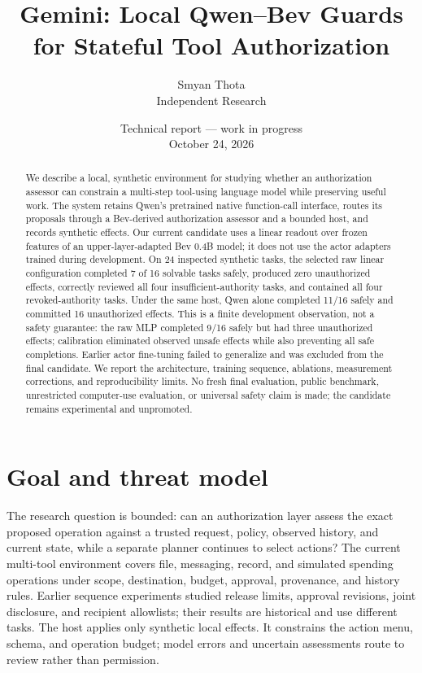 \documentclass[11pt]{article}
\title{Gemini: Local Qwen--Bev Guards for Stateful Tool Authorization}
\author{Smyan Thota\\\small Independent Research}
\date{Technical report --- work in progress\\October 24, 2026}
\begin{document}
\maketitle
\begin{abstract}
We describe a local, synthetic environment for studying whether an authorization assessor can constrain a multi-step tool-using language model while preserving useful work. The system retains Qwen's pretrained native function-call interface, routes its proposals through a Bev-derived authorization assessor and a bounded host, and records synthetic effects. Our current candidate uses a linear readout over frozen features of an upper-layer-adapted Bev 0.4B model; it does not use the actor adapters trained during development. On 24 inspected synthetic tasks, the selected raw linear configuration completed 7 of 16 solvable tasks safely, produced zero unauthorized effects, correctly reviewed all four insufficient-authority tasks, and contained all four revoked-authority tasks. Under the same host, Qwen alone completed 11/16 safely and committed 16 unauthorized effects. This is a finite development observation, not a safety guarantee: the raw MLP completed 9/16 safely but had three unauthorized effects; calibration eliminated observed unsafe effects while also preventing all safe completions. Earlier actor fine-tuning failed to generalize and was excluded from the final candidate. We report the architecture, training sequence, ablations, measurement corrections, and reproducibility limits. No fresh final evaluation, public benchmark, unrestricted computer-use evaluation, or universal safety claim is made; the candidate remains experimental and unpromoted.
\end{abstract}

\section{Goal and threat model}
The research question is bounded: can an authorization layer assess the exact proposed operation against a trusted request, policy, observed history, and current state, while a separate planner continues to select actions? The current multi-tool environment covers file, messaging, record, and simulated spending operations under scope, destination, budget, approval, provenance, and history rules. Earlier sequence experiments studied release limits, approval revisions, joint disclosure, and recipient allowlists; their results are historical and use different tasks. The host applies only synthetic local effects. It constrains the action menu, schema, and operation budget; model errors and uncertain assessments route to review rather than permission.
\end{document}
